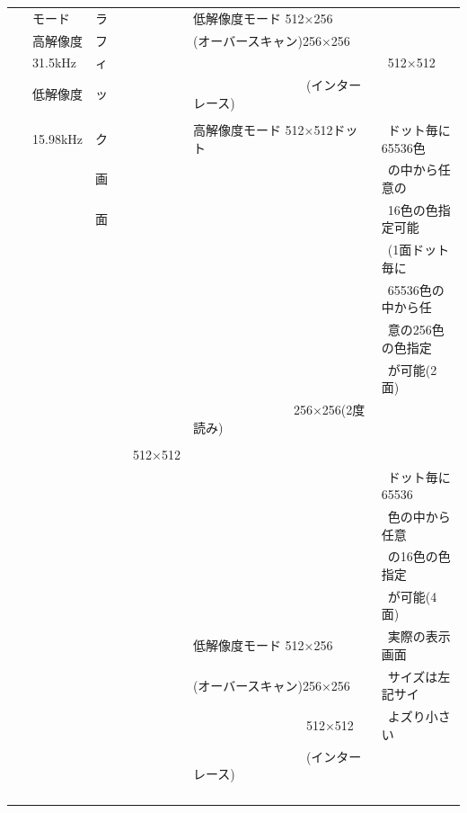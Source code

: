\documentclass[twoside,a4paper,12pt]{article}
\begin{document}
\begin{tabular}{|p{13mm}|p{23mm}|p{4mm}|p{20mm}|p{65mm}|p{36mm}|}
& \ モード & ラ & & 低解像度モード 512×256 &\\[2mm]
& \ 高解像度 & フ & & (オーバースキャン)256×256 &\\[2mm]
& \ 31.5kHz & ィ & & & \ 512×512\\[2mm]
& \ 低解像度 & ッ & & \ \ \ \ \ \ \ \ \ \ \ \ \ \ \ \ \ \ (インターレース) &\\
\cline{5-6}
& & & & &\\[-4mm]
& \ 15.98kHz & ク & & 高解像度モード 512×512ドット & \ ドット毎に65536色\\
& & 画 & & & \ の中から任意の\\
& & 面 & & & \ 16色の色指定可能\\
& & & & & \ (1面ドット毎に\\
& & & & & \ 65536色の中から任\\
& & & & & \ 意の256色の色指定\\
& & & & & \ が可能(2面)\\
& & & & \ \ \ \ \ \ \ \ \ \ \ \ \ \ \ \ 256×256(2度読み) &\\
& & & & &\\
& & & \ \ 512×512 & &\\
& & & & & \ ドット毎に65536\\
& & & & & \ 色の中から任意\\
& & & & & \ の16色の色指定\\
& & & & & \ が可能(4面)\\
& & & & 低解像度モード 512×256	& \ 実際の表示画面\\
& & & & (オーバースキャン)256×256 & \ サイズは左記サイ\\
& & & & \ \ \ \ \ \ \ \ \ \ \ \ \ \ \ \ \ \ 512×512 & \ よズり小さい\\
& & & & \ \ \ \ \ \ \ \ \ \ \ \ \ \ \ \ \ \ (インターレース) &\\
& & & & &\\
& & & & &\\
& & & & &\\
& & & & &\\
\hline
\end{tabular}

\newpage
\end{document}
